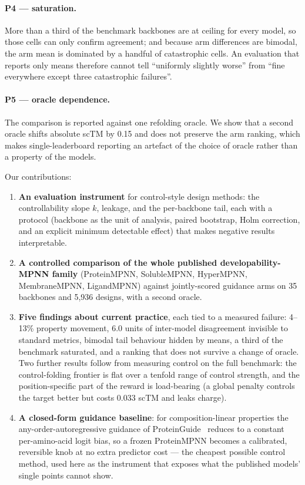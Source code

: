 \paragraph{P4 --- saturation.}
More than a third of the benchmark backbones are at ceiling for every model, so
those cells can only confirm agreement; and because arm differences are bimodal,
the arm mean is dominated by a handful of catastrophic cells. An evaluation that
reports only means therefore cannot tell ``uniformly slightly worse'' from
``fine everywhere except three catastrophic failures''.

\paragraph{P5 --- oracle dependence.}
The comparison is reported against one refolding oracle. We show that a second
oracle shifts absolute scTM by 0.15 and does not preserve the arm ranking, which
makes single-leaderboard reporting an artefact of the choice of oracle rather
than a property of the models.

Our contributions:

\begin{enumerate}
\item \textbf{An evaluation instrument} for control-style design methods: the
  controllability slope $k$, leakage, and the per-backbone tail, each with a
  protocol (backbone as the unit of analysis, paired bootstrap, Holm correction,
  and an explicit minimum detectable effect) that makes negative results
  interpretable.
\item \textbf{A controlled comparison of the whole published
  developability-MPNN family} (ProteinMPNN, SolubleMPNN, HyperMPNN,
  MembraneMPNN, LigandMPNN) against jointly-scored guidance arms on 35 backbones
  and 5,936 designs, with a second oracle.
\item \textbf{Five findings about current practice}, each tied to a measured
  failure: 4--13\% property movement, 6.0 units of inter-model disagreement
  invisible to standard metrics, bimodal tail behaviour hidden by means, a third
  of the benchmark saturated, and a ranking that does not survive a change of
  oracle. Two further results follow from measuring control on the full
  benchmark: the control-folding frontier is flat over a tenfold range of control
  strength, and the position-specific part of the reward is load-bearing (a
  global penalty controls the target better but costs 0.033 scTM and leaks
  charge).
\item \textbf{A closed-form guidance baseline}: for composition-linear
  properties the any-order-autoregressive guidance of
  ProteinGuide~\cite{proteinguide} reduces to a constant per-amino-acid logit
  bias, so a frozen ProteinMPNN becomes a calibrated, reversible knob at no
  extra predictor cost --- the cheapest possible control method, used here as
  the instrument that exposes what the published models' single points cannot
  show.
\end{enumerate}

